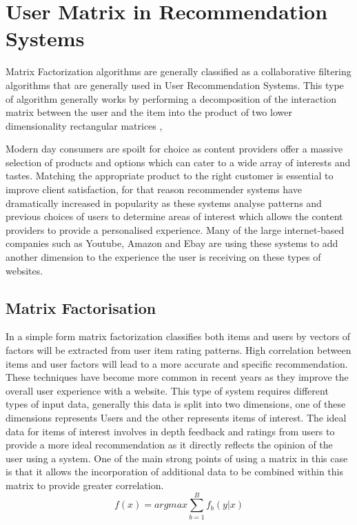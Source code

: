\chapter{User Matrix in Recommendation Systems}\label{ch:user-matrix}


Matrix Factorization algorithms are generally classified as a collaborative filtering algorithms that are generally used in User Recommendation Systems. This type of algorithm generally works by performing a decomposition of the interaction matrix between the user and the item into the product of two lower dimensionality rectangular matrices \citep{Koren2006},

Modern day consumers are spoilt for choice as content providers offer a massive selection of products and options which can cater to a wide array of interests and tastes. Matching the appropriate product to the right customer is essential to improve client satisfaction, for that reason recommender systems have dramatically increased in popularity as these systems analyse patterns and previous choices of users to determine areas of interest which allows the content providers to provide a personalised experience. Many of the large internet-based companies such as Youtube, Amazon and Ebay are using these systems to add another dimension to the experience the user is receiving on these types of websites.
\section{Matrix Factorisation}
In a simple form matrix factorization classifies both items and users by vectors of factors will be extracted from user item rating patterns. High correlation between items and user factors will lead to a more accurate and specific recommendation. These techniques have become more common in recent years as they improve the overall user experience with a website. This type of system requires different types of input data, generally this data is split into two dimensions, one of these dimensions represents Users and the other represents items of interest. The ideal data for items of interest involves in depth feedback and ratings from users to provide a more ideal recommendation as it directly reflects the opinion of the user using a system. One of the main strong points of using a matrix in this case is that it allows the incorporation of additional data to be combined within this matrix to provide greater correlation. 
\begin{equation}\label{eq:baggingvote}
    f(x) = argmax \sum_{b=1}^{B} f_b(y | x)
\end{equation}

